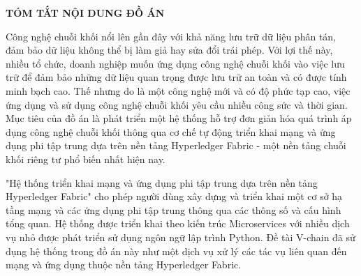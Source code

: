 \documentclass[../DoAn.tex]{subfiles}
\begin{document}
\begin{center}
    \Large{\textbf{TÓM TẮT NỘI DUNG ĐỒ ÁN}}\\
\end{center}
\vspace{1cm}

Công nghệ chuỗi khối nổi lên gần đây với khả năng lưu trữ dữ liệu phân tán, đảm bảo dữ liệu không thể bị làm giả hay sửa đổi trái phép. Với lợi thế này, nhiều tổ chức, doanh nghiệp muốn ứng dụng công nghệ chuỗi khối vào việc lưu trữ để đảm bảo những dữ liệu quan trọng được lưu trữ an toàn và có được tính minh bạch cao. Thế nhưng do là một công nghệ mới và có độ phức tạp cao, việc ứng dụng và sử dụng công nghệ chuỗi khối yêu cầu nhiều công sức và thời gian. Mục tiêu của đồ án là phát triển một hệ thống hỗ trợ đơn giản hóa quá trình áp dụng công nghệ chuỗi khối thông qua cơ chế tự động triển khai mạng và ứng dụng phi tập trung dựa trên nền tảng Hyperledger Fabric - một nền tảng chuỗi khối riêng tư phổ biến nhất hiện nay.

"Hệ thống triển khai mạng và ứng dụng phi tập trung dựa trên nền tảng Hyperledger Fabric" cho phép người dùng xây dựng và triển khai một cơ sở hạ tầng mạng và các ứng dụng phi tập trung thông qua các thông số và cấu hình tổng quan. Hệ thống được triển khai theo kiến trúc Microservices với nhiều dịch vụ nhỏ được phát triển sử dụng ngôn ngữ lập trình Python. Đề tài V-chain \cite{vchain} đã sử dụng hệ thống trong đồ án này như một dịch vụ xử lý các tác vụ liên quan đến mạng và ứng dụng thuộc nền tảng Hyperledger Fabric.
\end{document}
